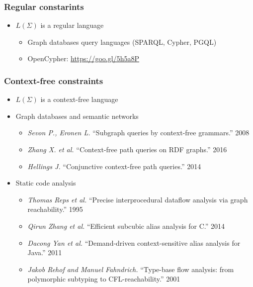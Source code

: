 \documentclass[xcolor=table,aspectratio=169]{beamer}
\begin{document}
\begin{frame}[fragile]
  \transwipe[direction=90]
  \frametitle{Regular constarints}
  \begin{itemize}
  \item $L(\Sigma)$ is a regular language
    \begin{itemize}
      \item Graph databases query languages (SPARQL, Cypher, PGQL)
      \item OpenCypher: \url{https://goo.gl/5h5a8P}
    \end{itemize}  
  \end{itemize}
\end{frame}


\begin{frame}[fragile]
  \transwipe[direction=90]
  \frametitle{Context-free constraints}
  \begin{itemize}
  \item $L(\Sigma)$ is a context-free language
  \item Graph databases and semantic networks
    \begin{itemize}
        \item \emph{Sevon P., Eronen L.} ``Subgraph queries by context-free grammars.'' 2008
        \item \emph{Zhang X. et al.} ``Context-free path queries on RDF graphs.'' 2016
        \item \emph{Hellings J.} ``Conjunctive context-free path queries.'' 2014
    \end{itemize}
    \item Static code analysis
    \begin{itemize}
        \item \emph{Thomas Reps et al.} ``Precise interprocedural dataflow analysis via graph reachability.'' 1995 
        \item \emph{Qirun Zhang et al.}  ``Efficient subcubic alias analysis for C.'' 2014
        \item \emph{Dacong Yan et al.} ``Demand-driven context-sensitive alias analysis for Java.'' 2011
        \item \emph{Jakob Rehof and Manuel Fahndrich.} ``Type-base flow analysis: from polymorphic subtyping to CFL-reachability.'' 2001
    \end{itemize}
  \end{itemize}
\end{frame}
\end{document}
